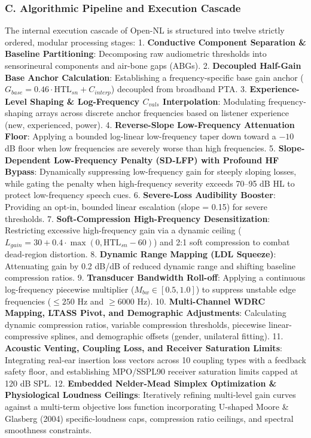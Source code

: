 \documentclass[
  12pt,
]{article}
\begin{document}
\subsubsection{C. Algorithmic Pipeline and Execution
Cascade}\label{c.-algorithmic-pipeline-and-execution-cascade}

The internal execution cascade of Open-NL is structured into twelve
strictly ordered, modular processing stages: 1. \textbf{Conductive
Component Separation \& Baseline Partitioning}: Decomposing raw
audiometric thresholds into sensorineural components and air-bone gaps
(ABGs). 2. \textbf{Decoupled Half-Gain Base Anchor Calculation}:
Establishing a frequency-specific base gain anchor
(\(G_{base} = 0.46 \cdot \text{HTL}_{sn} + C_{interp}\)) decoupled from
broadband PTA. 3. \textbf{Experience-Level Shaping \& Log-Frequency
\(C_{vals}\) Interpolation}: Modulating frequency-shaping arrays across
discrete anchor frequencies based on listener experience (new,
experienced, power). 4. \textbf{Reverse-Slope Low-Frequency Attenuation
Floor}: Applying a bounded log-linear low-frequency taper down toward a
\(-10\) dB floor when low frequencies are severely worse than high
frequencies. 5. \textbf{Slope-Dependent Low-Frequency Penalty (SD-LFP)
with Profound HF Bypass}: Dynamically suppressing low-frequency gain for
steeply sloping losses, while gating the penalty when high-frequency
severity exceeds 70--95 dB HL to protect low-frequency speech cues. 6.
\textbf{Severe-Loss Audibility Booster}: Providing an opt-in, bounded
linear escalation (slope = 0.15) for severe thresholds. 7.
\textbf{Soft-Compression High-Frequency Desensitization}: Restricting
excessive high-frequency gain via a dynamic ceiling
(\(L_{gain} = 30 + 0.4 \cdot \max(0, \text{HTL}_{sn} - 60)\)) and 2:1
soft compression to combat dead-region distortion. 8. \textbf{Dynamic
Range Mapping (LDL Squeeze)}: Attenuating gain by 0.2 dB/dB of reduced
dynamic range and shifting baseline compression ratios. 9.
\textbf{Transducer Bandwidth Roll-off}: Applying a continuous
log-frequency piecewise multiplier (\(M_{bw} \in [0.5, 1.0]\)) to
suppress unstable edge frequencies (\(\le 250\) Hz and \(\ge 6000\) Hz).
10. \textbf{Multi-Channel WDRC Mapping, LTASS Pivot, and Demographic
Adjustments}: Calculating dynamic compression ratios, variable
compression thresholds, piecewise linear-compressive splines, and
demographic offsets (gender, unilateral fitting). 11. \textbf{Acoustic
Venting, Coupling Loss, and Receiver Saturation Limits}: Integrating
real-ear insertion loss vectors across 10 coupling types with a feedback
safety floor, and establishing MPO/SSPL90 receiver saturation limits
capped at 120 dB SPL. 12. \textbf{Embedded Nelder-Mead Simplex
Optimization \& Physiological Loudness Ceilings}: Iteratively refining
multi-level gain curves against a multi-term objective loss function
incorporating U-shaped Moore \& Glasberg (2004) specific-loudness caps,
compression ratio ceilings, and spectral smoothness constraints.
\end{document}
